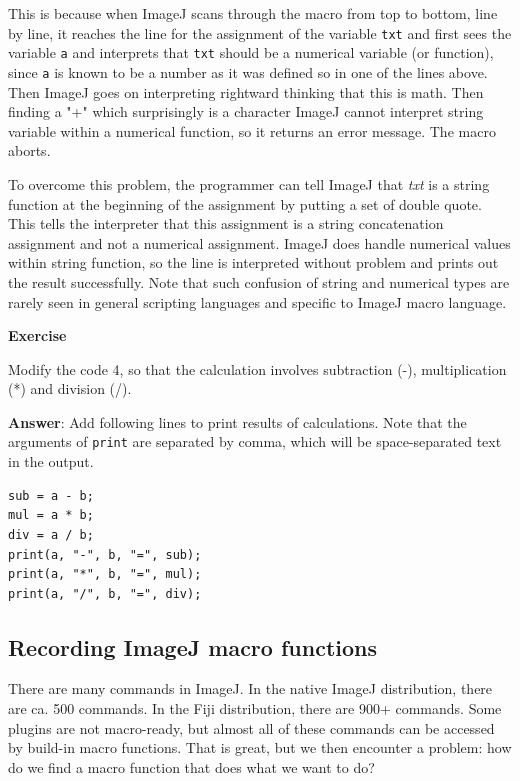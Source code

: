 \documentclass[11pt,a4paper,oneside]{report}
\newenvironment{indentexercise}[1]
{{\setlength{\leftmargin}{2em}}
\textbf{Exercise \thesubsection-#1}
\begin{list}{}
	\item
}
{\end{list}}
\newcommand{\ilcom}[1]{\texttt{\small#1}}
\begin{document}
This is because when ImageJ scans through the macro from top to bottom, line by line, 
it reaches the line for the assignment of the variable \ilcom{txt} and first sees the variable \ilcom{a} and interprets that \ilcom{txt} should be a numerical variable 
(or function), since \ilcom{a} is known to be a number as it was defined so in one of the lines above. Then ImageJ goes on interpreting rightward thinking that this is math. Then finding a "+" which surprisingly is a character
ImageJ cannot interpret string variable within a numerical function, so it returns an error message. The macro aborts.  

To overcome this problem, the programmer can tell ImageJ that 
\textit{txt} is a string function at the beginning of the assignment 
by putting a set of double quote. This tells the interpreter that this assignment is a string concatenation assignment and not a numerical assignment. 
ImageJ does handle numerical values within string function, 
so the line is interpreted without problem and prints out the result successfully. Note that such confusion of string and numerical types are rarely seen in general scripting languages and specific to ImageJ macro language.

\begin{indentexercise}{2}

\item Modify the code 4, so that the calculation involves subtraction (-), multiplication (*) and division (/).

\item \textbf{Answer}: Add following lines to print results of calculations. Note that the arguments of \ilcom{print} are separated by comma, which will be space-separated text in the output.  
\begin{lstlisting}[numbers=none]
sub = a - b;
mul = a * b;
div = a / b;
print(a, "-", b, "=", sub);
print(a, "*", b, "=", mul);
print(a, "/", b, "=", div);
\end{lstlisting}

\end{indentexercise}
   \subsection{Recording ImageJ macro functions}
There are many commands in ImageJ. In the native ImageJ distribution, there are ca. 500 commands. In the Fiji distribution, there are 900+ commands. Some plugins are not macro-ready, but almost all of these commands can be accessed by build-in macro functions. That is great, but we then encounter a problem: how do we find a macro function that does what we want to do?
\end{document}
